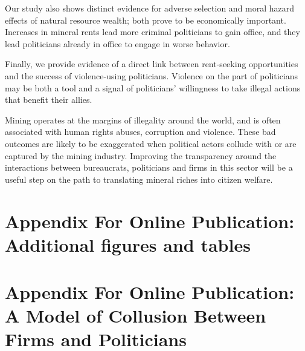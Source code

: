 \documentclass[12pt,letterpaper]{article}
\begin{document}
Our study also shows distinct evidence for adverse selection and moral
hazard effects of natural resource wealth; both prove to be
economically important. Increases in mineral rents lead more criminal
politicians to gain office, and they lead politicians already in
office to engage in worse behavior.

Finally, we provide evidence of a direct link between rent-seeking
opportunities and the success of violence-using politicians. Violence
on the part of politicians may be both a tool and a signal of 
politicians' willingness to take illegal actions that benefit their
allies.

Mining operates at the margins of illegality around the world, and is
often associated with human rights abuses, corruption and
violence. These bad outcomes are likely to be exaggerated when
political actors collude with or are captured by the mining
industry. Improving the transparency around the interactions between
bureaucrats, politicians and firms in this sector will be a useful
step on the path to translating mineral riches into citizen welfare.

\newpage
\singlespace
\begin{appendix}
  
  \newpage
  \singlespace
  
  

  \newpage
  \singlespace
  
  
  
  
  \newpage
  \section{Appendix For Online Publication: Additional figures and tables}
  
  \setcounter{table}{0}
  \renewcommand{\thetable}{A\arabic{table}}
  \setcounter{figure}{0}
  \renewcommand{\thefigure}{A\arabic{figure}}
  \label{app:more_figs}
  
  
  \newpage
  \section{Appendix For Online Publication: A Model of Collusion Between
    Firms and Politicians}
  \label{sec:model}
  
  
\end{appendix}
\end{document}
